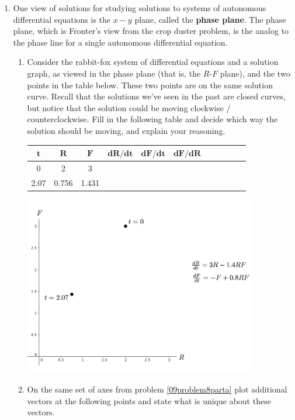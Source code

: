 \begin{enumerate}[resume]
\clearpage
\item One view of solutions for studying solutions to systems of autonomous differential equations is the $x-y$ plane, called the \textbf{phase plane}. The phase plane, which is Fronter's view from the crop duster problem, is the analog to the phase line for a single autonomous differential equation. \label{09problem8} 

\begin{enumerate}
\item Consider the rabbit-fox system of differential equations and a solution graph, as viewed in the phase plane (that is, the $R$-$F$ plane), and the two points in the table below. These two points are on the same solution curve. Recall that the solutions we've seen in the past are closed curves, but notice that the solution could be moving clockwise / counterclockwise. Fill in the following table and decide which way the solution should be moving, and explain your reasoning. \label{09problem8parta}	

\begin{center}
\renewcommand{\arraystretch}{2}
\begin{tabular}{|c|c|c|c|c|cccccc|}
\hline
$\mathbf{t}$ & $\mathbf{R}$ & $\mathbf{F}$ & $\mathbf{dR/dt} $ & $\mathbf{dF/dt}$ & $\mathbf{dF/dR}$ & & & & & \\ \hline

0 & 2 & 3 & & & & & & & & \\ \hline
2.07 & 0.756 & 1.431 & & & & & & & & \\ \hline
\end{tabular}

\includegraphics[width=4in]{09/09Clockwise.png}
\end{center}

\item	On the same set of axes from problem \ref{09problem8parta} plot additional vectors at the following points and state what is unique about these vectors. \label{09problem8partb}


\end{enumerate}
\end{enumerate}
